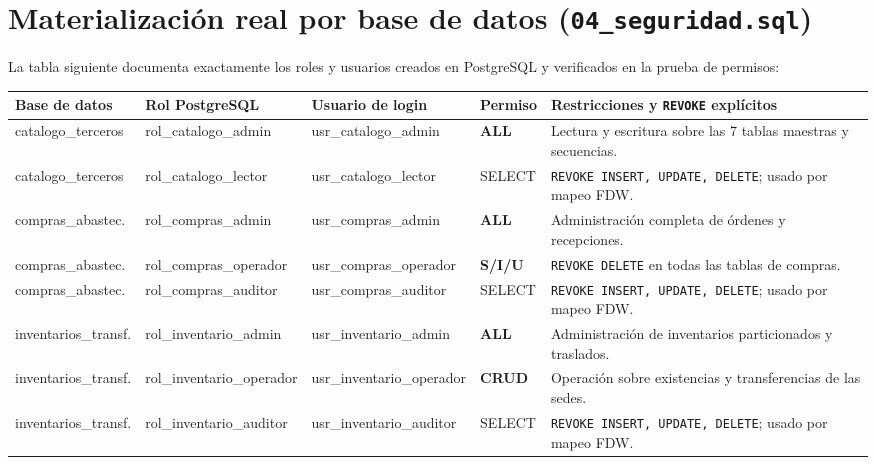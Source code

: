 \documentclass[11pt,oneside]{article}
\newcommand{\pALL}{%
  \textcolor{acento}{\sffamily\bfseries ALL}}
\newcommand{\pCRUD}{%
  \textcolor{ok!85!black}{\sffamily\bfseries CRUD}}
\newcommand{\pSEL}{%
  \textcolor{gris}{\sffamily SELECT}}
\newcommand{\pSIU}{%
  \textcolor{gris}{\sffamily\bfseries S/I/U}}
\begin{document}
\section{Materializaci\'on real por base de datos (\texttt{04\_seguridad.sql})}

La tabla siguiente documenta exactamente los roles y usuarios creados en
PostgreSQL y verificados en la prueba de permisos:

\begin{center}
\renewcommand{\arraystretch}{1.35}
{\footnotesize
\begin{tabularx}{\linewidth}{%
    >{\ttfamily\scriptsize}p{3.15cm}
    >{\ttfamily\scriptsize}p{3.05cm}
    >{\ttfamily\scriptsize}p{2.95cm}
    >{\centering\arraybackslash}p{1.25cm}
    >{\small\raggedright\arraybackslash}X}
\toprule
\rowcolor{fondo}
{\sffamily\bfseries Base de datos} &
{\sffamily\bfseries Rol PostgreSQL} &
{\sffamily\bfseries Usuario de login} &
{\sffamily\bfseries Permiso} &
{\sffamily\bfseries Restricciones y \texttt{REVOKE} expl\'icitos} \\
\midrule
catalogo\_terceros & rol\_catalogo\_admin & usr\_catalogo\_admin & \pALL &
  Lectura y escritura sobre las 7 tablas maestras y secuencias. \\
catalogo\_terceros & rol\_catalogo\_lector & usr\_catalogo\_lector & \pSEL &
  \texttt{REVOKE INSERT, UPDATE, DELETE}; usado por mapeo FDW. \\
\midrule
compras\_abastec. & rol\_compras\_admin & usr\_compras\_admin & \pALL &
  Administraci\'on completa de \'ordenes y recepciones. \\
compras\_abastec. & rol\_compras\_operador & usr\_compras\_operador & \pSIU &
  \texttt{REVOKE DELETE} en todas las tablas de compras. \\
compras\_abastec. & rol\_compras\_auditor & usr\_compras\_auditor & \pSEL &
  \texttt{REVOKE INSERT, UPDATE, DELETE}; usado por mapeo FDW. \\
\midrule
inventarios\_transf. & rol\_inventario\_admin & usr\_inventario\_admin & \pALL &
  Administraci\'on de inventarios particionados y traslados. \\
inventarios\_transf. & rol\_inventario\_operador & usr\_inventario\_operador & \pCRUD &
  Operaci\'on sobre existencias y transferencias de las sedes. \\
inventarios\_transf. & rol\_inventario\_auditor & usr\_inventario\_auditor & \pSEL &
  \texttt{REVOKE INSERT, UPDATE, DELETE}; usado por mapeo FDW. \\
\midrule

\end{tabularx}}
\end{center}
\end{document}
